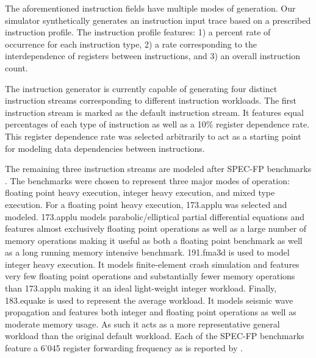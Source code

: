 The aforementioned instruction fields have multiple modes of generation.  Our simulator synthetically generates an instruction input trace based on a prescribed instruction profile.  The instruction profile features: 1) a percent rate of occurrence for each instruction type, 2) a rate corresponding to the interdependence of registers between instructions, and 3) an overall instruction count.

The instruction generator is currently capable of generating four distinct instruction streams corresponding to different instruction workloads.  The first instruction stream is marked as the default instruction stream.  It features equal percentages of each type of instruction as well as a 10\% register dependence rate.  This register dependence rate was selected arbitrarily to act as a starting point for modeling data dependencies between instructions.

The remaining three instruction streams are modeled after SPEC-FP benchmarks \cite{rupnow}.  The benchmarks were chosen to represent three major modes of operation:  floating point heavy execution, integer heavy execution, and mixed type execution.  For a floating point heavy execution, 173.applu was selected and modeled.  173.applu models parabolic/elliptical partial differential equations and features almost exclusively floating point operations as well as a large number of memory operations making it useful as both a floating point benchmark as well as a long running memory intensive benchmark.  191.fma3d is used to model integer heavy execution.  It models finite-element crash simulation and features very few floating point operations and substantially fewer memory operations than 173.applu making it an ideal light-weight integer workload.  Finally, 183.equake is used to represent the average workload.  It models seismic wave propagation and features both integer and floating point operations as well as moderate memory usage.  As such it acts as a more representative general workload than the original default workload.  Each of the SPEC-FP benchmarks feature a 6{\char'045} register forwarding frequency as is reported by \cite{kucuk}.

